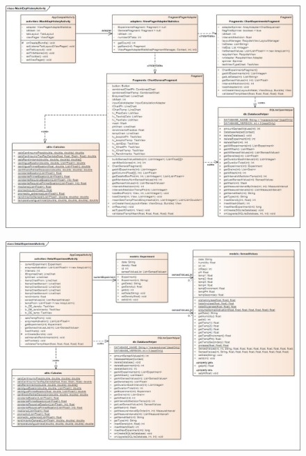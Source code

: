         \begin{figure}
        \centering
        \includegraphics[scale=0.5, angle=90]{Anexo/DiagramasClase/MashExpHistoryActivity.jpg}
        \label{fig:DiagClaseMashExpHistoryActivity}
        \end{figure}
    
        \begin{figure}
        \centering
        \includegraphics[scale=0.5, angle=90]{Anexo/DiagramasClase/DetailExperimentActivity.jpg}
        \label{fig:DiagClaseDetailExperimentActivity}
        \end{figure}
    
